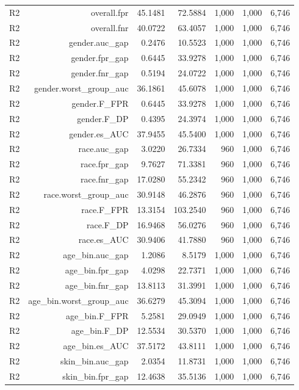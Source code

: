 \documentclass[10pt]{article}
\begin{document}
\begin{longtable}{@{}lrrrrrr@{}}
R2 & overall.fpr & 45.1481 & 72.5884 & 1,000 & 1,000 & 6,746 \\
R2 & overall.fnr & 40.0722 & 63.4057 & 1,000 & 1,000 & 6,746 \\
R2 & gender.auc\_gap & 0.2476 & 10.5523 & 1,000 & 1,000 & 6,746 \\
R2 & gender.fpr\_gap & 0.6445 & 33.9278 & 1,000 & 1,000 & 6,746 \\
R2 & gender.fnr\_gap & 0.5194 & 24.0722 & 1,000 & 1,000 & 6,746 \\
R2 & gender.worst\_group\_auc & 36.1861 & 45.6078 & 1,000 & 1,000 & 6,746 \\
R2 & gender.F\_FPR & 0.6445 & 33.9278 & 1,000 & 1,000 & 6,746 \\
R2 & gender.F\_DP & 0.4395 & 24.3974 & 1,000 & 1,000 & 6,746 \\
R2 & gender.es\_AUC & 37.9455 & 45.5400 & 1,000 & 1,000 & 6,746 \\
R2 & race.auc\_gap & 3.0220 & 26.7334 & 960 & 1,000 & 6,746 \\
R2 & race.fpr\_gap & 9.7627 & 71.3381 & 960 & 1,000 & 6,746 \\
R2 & race.fnr\_gap & 17.0280 & 55.2342 & 960 & 1,000 & 6,746 \\
R2 & race.worst\_group\_auc & 30.9148 & 46.2876 & 960 & 1,000 & 6,746 \\
R2 & race.F\_FPR & 13.3154 & 103.2540 & 960 & 1,000 & 6,746 \\
R2 & race.F\_DP & 16.9468 & 56.0276 & 960 & 1,000 & 6,746 \\
R2 & race.es\_AUC & 30.9406 & 41.7880 & 960 & 1,000 & 6,746 \\
R2 & age\_bin.auc\_gap & 1.2086 & 8.5179 & 1,000 & 1,000 & 6,746 \\
R2 & age\_bin.fpr\_gap & 4.0298 & 22.7371 & 1,000 & 1,000 & 6,746 \\
R2 & age\_bin.fnr\_gap & 13.8113 & 31.3991 & 1,000 & 1,000 & 6,746 \\
R2 & age\_bin.worst\_group\_auc & 36.6279 & 45.3094 & 1,000 & 1,000 & 6,746 \\
R2 & age\_bin.F\_FPR & 5.2581 & 29.0949 & 1,000 & 1,000 & 6,746 \\
R2 & age\_bin.F\_DP & 12.5534 & 30.5370 & 1,000 & 1,000 & 6,746 \\
R2 & age\_bin.es\_AUC & 37.5172 & 43.8111 & 1,000 & 1,000 & 6,746 \\
R2 & skin\_bin.auc\_gap & 2.0354 & 11.8731 & 1,000 & 1,000 & 6,746 \\
R2 & skin\_bin.fpr\_gap & 12.4638 & 35.5136 & 1,000 & 1,000 & 6,746 \\

\end{longtable}
\end{document}
